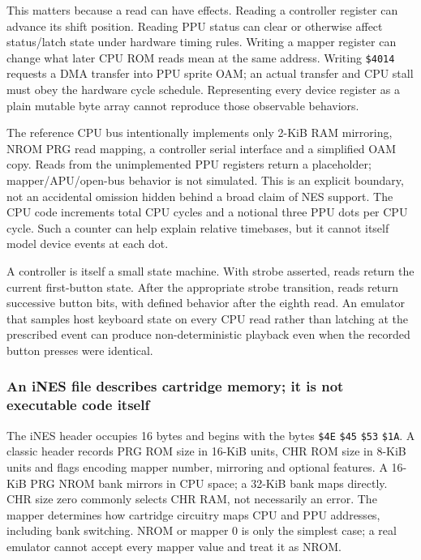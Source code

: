 This matters because a read can have effects. Reading a controller register can advance its shift position. Reading PPU status can clear or otherwise affect status/latch state under hardware timing rules. Writing a mapper register can change what later CPU ROM reads mean at the same address. Writing \texttt{\$4014} requests a DMA transfer into PPU sprite OAM; an actual transfer and CPU stall must obey the hardware cycle schedule. Representing every device register as a plain mutable byte array cannot reproduce those observable behaviors.

The reference CPU bus intentionally implements only 2-KiB RAM mirroring, NROM PRG read mapping, a controller serial interface and a simplified OAM copy. Reads from the unimplemented PPU registers return a placeholder; mapper/APU/open-bus behavior is not simulated. This is an explicit boundary, not an accidental omission hidden behind a broad claim of NES support. The CPU code increments total CPU cycles and a notional three PPU dots per CPU cycle. Such a counter can help explain relative timebases, but it cannot itself model device events at each dot.

A controller is itself a small state machine. With strobe asserted, reads return the current first-button state. After the appropriate strobe transition, reads return successive button bits, with defined behavior after the eighth read. An emulator that samples host keyboard state on every CPU read rather than latching at the prescribed event can produce non-deterministic playback even when the recorded button presses were identical.

\subsubsection{An iNES file describes cartridge memory; it is not executable code itself}\label{an-ines-file-describes-cartridge-memory-it-is-not-executable-code-itself}

The iNES header occupies 16 bytes and begins with the bytes \texttt{\$4E} \texttt{\$45} \texttt{\$53} \texttt{\$1A}. A classic header records PRG ROM size in 16-KiB units, CHR ROM size in 8-KiB units and flags encoding mapper number, mirroring and optional features. A 16-KiB PRG NROM bank mirrors in CPU space; a 32-KiB bank maps directly. CHR size zero commonly selects CHR RAM, not necessarily an error. The mapper determines how cartridge circuitry maps CPU and PPU addresses, including bank switching. NROM or mapper 0 is only the simplest case; a real emulator cannot accept every mapper value and treat it as NROM.

